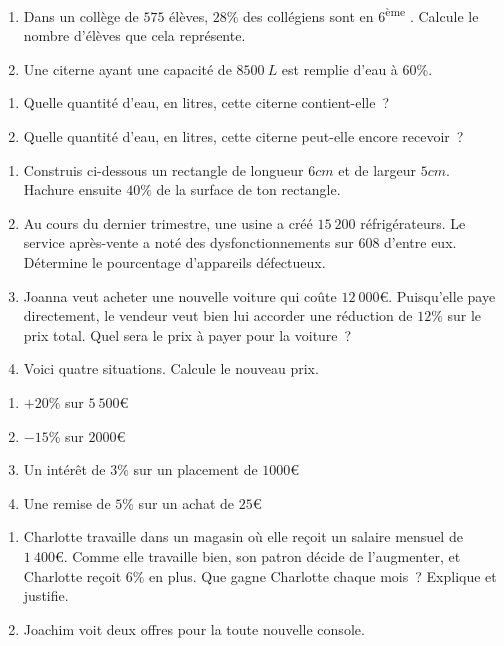 \begin{enumerate}
\def\labelenumi{\arabic{enumi}.}
\setcounter{enumi}{5}
\item
  Dans un collège de \(575\) élèves, \(28\%\) des collégiens sont en
  \(6\)\textsuperscript{ème} . Calcule le nombre d'élèves que cela
  représente.
\item
  Une citerne ayant une capacité de \(8500\ L\) est remplie d'eau à
  \(60\%\).
\end{enumerate}

\begin{enumerate}
\def\labelenumi{\alph{enumi}.}
\item
  Quelle quantité d'eau, en litres, cette citerne contient-elle~?
\item
  Quelle quantité d'eau, en litres, cette citerne peut-elle encore
  recevoir~?
\end{enumerate}

\begin{enumerate}
\def\labelenumi{\arabic{enumi}.}
\setcounter{enumi}{7}
\item
  Construis ci-dessous un rectangle de longueur \(6cm\) et de largeur
  \(5cm.\) Hachure ensuite \(40\%\) de la surface de ton rectangle.
\item
  Au cours du dernier trimestre, une usine a créé \(15\ 200\)
  réfrigérateurs. Le service après-vente a noté des dysfonctionnements
  sur \(608\) d'entre eux. Détermine le pourcentage d'appareils
  défectueux.
\item
  Joanna veut acheter une nouvelle voiture qui coûte \(12\ 000€\).
  Puisqu'elle paye directement, le vendeur veut bien lui accorder une
  réduction de \(12\%\) sur le prix total. Quel sera le prix à payer
  pour la voiture~?
\item
  Voici quatre situations. Calcule le nouveau prix.
\end{enumerate}

\begin{enumerate}
\def\labelenumi{\alph{enumi}.}
\item
  \(+ 20\%\) sur \(5\ 500€\)
\item
  \(- 15\%\) sur \(2000€\)
\item
  Un intérêt de \(3\%\) sur un placement de \(1000€\)
\item
  Une remise de \(5\%\) sur un achat de \(25€\)
\end{enumerate}

\begin{enumerate}
\def\labelenumi{\arabic{enumi}.}
\setcounter{enumi}{11}
\item
  Charlotte travaille dans un magasin où elle reçoit un salaire mensuel
  de \(1\ 400€.\) Comme elle travaille bien, son patron décide de
  l'augmenter, et Charlotte reçoit \(6\%\) en plus. Que gagne Charlotte
  chaque mois~? Explique et justifie.
\item
  Joachim voit deux offres pour la toute nouvelle console.
\end{enumerate}

